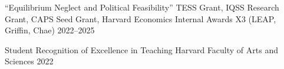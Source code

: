 


	


\begin{cvhonors}
\cvhonor
    {``Equilibrium Neglect and Political Feasibility''} %
    {TESS Grant, IQSS Research Grant, CAPS Seed Grant, Harvard Economics Internal Awards X3 (LEAP, Griffin, Chae)} %
    {} %
    {2022--2025} %

\end{cvhonors}

\begin{cvhonors}

\cvhonor
    {Student Recognition of Excellence in Teaching} %
    {Harvard Faculty of Arts and Sciences} %
    {} %
    {2022} %

\end{cvhonors}

